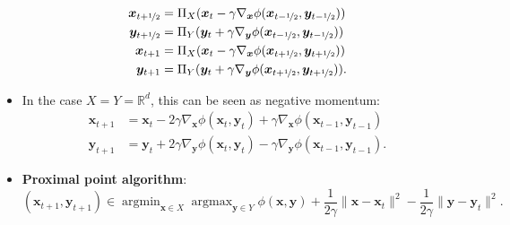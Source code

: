 \documentclass[8pt,a4paper]{extarticle}
\DeclareMathOperator*{\argmax}{argmax}
\DeclareMathOperator*{\argmin}{argmin}
\newcommand{\R}{\mathbb{R}}
\renewcommand{\vec}[1]{\bm{#1}}
\newenvironment{topic}[1]
{\textbf{\sffamily \colorbox{black}{\rlap{\textbf{\textcolor{white}{#1}}}\hspace{\linewidth}\hspace{-2\fboxsep}}} \\ \vspace{0.2cm}}
{}
\begin{document}
\begin{multicols*}{2}
\begin{topic}{Min-max optimization}
\begin{itemize}
\begin{align*}
                      \vec{x}_{t+\nicefrac{1}{2}} & = \Pi_X(\vec{x}_t - \gamma \nabla_{\vec{x}} \phi(\vec{x}_{t-\nicefrac{1}{2}}, \vec{y}_{t-\nicefrac{1}{2}}))  \\
                      \vec{y}_{t+\nicefrac{1}{2}} & = \Pi_Y(\vec{y}_t + \gamma \nabla_{\vec{y}} \phi(\vec{x}_{t-\nicefrac{1}{2}}, \vec{y}_{t-\nicefrac{1}{2}}))  \\
                      \vec{x}_{t+1}               & = \Pi_X(\vec{x}_t - \gamma \nabla_{\vec{x}} \phi(\vec{x}_{t+\nicefrac{1}{2}}, \vec{y}_{t+\nicefrac{1}{2}}))  \\
                      \vec{y}_{t+1}               & = \Pi_Y(\vec{y}_t + \gamma \nabla_{\vec{y}} \phi(\vec{x}_{t+\nicefrac{1}{2}}, \vec{y}_{t+\nicefrac{1}{2}})).
                  \end{align*}
            \item In the case $X = Y = \R^d$, this can be seen as negative momentum:
                  \begin{align*}
                      \vec{x}_{t+1} & = \vec{x}_t - 2 \gamma \nabla_{\vec{x}} \phi(\vec{x}_t, \vec{y}_t) + \gamma \nabla_{\vec{x}} \phi(\vec{x}_{t-1}, \vec{y}_{t-1})  \\
                      \vec{y}_{t+1} & = \vec{y}_t + 2 \gamma \nabla_{\vec{y}} \phi(\vec{x}_t, \vec{y}_t) - \gamma \nabla_{\vec{y}} \phi(\vec{x}_{t-1}, \vec{y}_{t-1}).
                  \end{align*}
            \item \textbf{Proximal point algorithm}: \[
                      (\vec{x}_{t+1}, \vec{y}_{t+1}) \in \argmin_{\vec{x} \in X} \argmax_{\vec{y} \in Y} \phi(\vec{x}, \vec{y}) + \frac{1}{2 \gamma} \| \vec{x} - \vec{x}_t \|^2 - \frac{1}{2 \gamma} \| \vec{y} - \vec{y}_t \|^2.
                  \]
        \end{itemize}
    \end{topic}


\end{multicols*}
\end{document}
